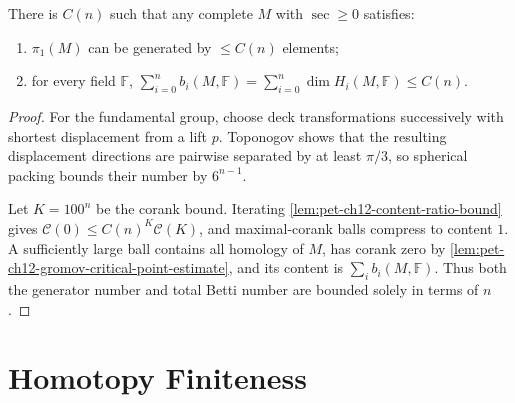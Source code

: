 \begin{theorem}
  \label{thm:pet-ch12-betti-number-finiteness}

  There is $C(n)$ such that any complete $M$ with $\sec\ge0$ satisfies:
  \begin{enumerate}
    \item $\pi_1(M)$ can be generated by $\le C(n)$ elements;
    \item for every field $\mathbb{F}$,
      $\sum_{i=0}^n b_i(M,\mathbb{F})=\sum_{i=0}^n\dim H_i(M,\mathbb{F})\le C(n)$.
  \end{enumerate}
\end{theorem}
\begin{proof}
  \sketch
  For the fundamental group, choose deck transformations successively with
  shortest displacement from a lift \(p\). Toponogov shows that the resulting
  displacement directions are pairwise separated by at least \(\pi/3\), so
  spherical packing bounds their number by \(6^{n-1}\).

  Let \(K=100^n\) be the corank bound. Iterating
  \cref{lem:pet-ch12-content-ratio-bound}
  gives \(\mathcal C(0)\le C(n)^K\mathcal C(K)\), and maximal-corank balls
  compress to content \(1\). A sufficiently large ball contains all homology
  of \(M\), has corank zero by
  \cref{lem:pet-ch12-gromov-critical-point-estimate}, and its content is
  \(\sum_i b_i(M,\mathbb F)\). Thus both the generator number and total Betti
  number are bounded solely in terms of \(n\).
\end{proof}

\section{Homotopy Finiteness}

